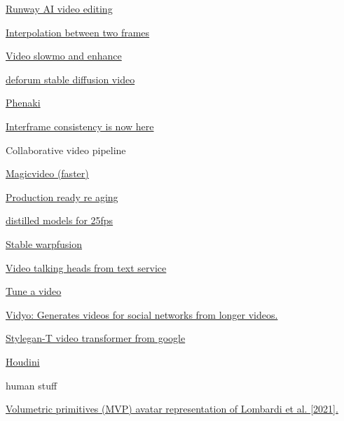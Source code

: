         \href{https://www.youtube.com/c/RunwayML}{Runway AI video
        editing}
       
        \href{https://film-net.github.io/}{Interpolation between two
        frames}
       
        \href{http://zeyuan-chen.com/VideoINR/}{Video slowmo and
        enhance}
       
        \href{https://github.com/HelixNGC7293/DeforumStableDiffusionLocal}{deforum
        stable diffusion video}
       
        \href{https://phenaki.video/}{Phenaki}
       
        \href{https://twitter.com/cut_pow/status/1576748659051749377}{Interframe
        consistency is now here}
       
        Collaborative video pipeline
       
        \href{https://magicvideo.github.io/}{Magicvideo (faster)}
       
        \href{https://studios.disneyresearch.com/2022/11/30/production-ready-face-re-aging-for-visual-effects/}{Production
        ready re aging}
       
        \href{https://arxiv.org/abs/2202.00512}{distilled models for
        25fps}
       
        \href{https://www.linkedin.com/posts/rainisto_stablediffusion-musicvideo-remix-activity-7018207241522614272-YT1y?utm_source=share\&utm_medium=member_desktop}{Stable
        warpfusion}
       
        \href{https://www.synthesia.io/}{Video talking heads from text
        service}
       
        \href{https://tuneavideo.github.io/}{Tune a video}
       
        \href{https://vidyo.ai/}{Vidyo: Generates videos for social
        networks from longer videos.}
       
        \href{https://sites.google.com/view/stylegan-t}{Stylegan-T video
        transformer from google}
       
        \href{https://github.com/proceduralit/StableDiffusion_Houdini}{Houdini}
       
     
      human stuff

       
      \tightlist
       
        \href{https://dl.acm.org/doi/abs/10.1145/3528233.3530740}{Volumetric
        primitives (MVP) avatar representation of Lombardi et al.
        {[}2021{]}.}
       
